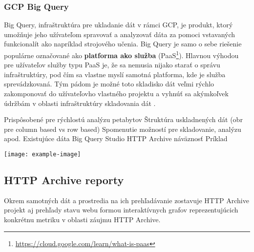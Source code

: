 \subsubsection{GCP Big Query}

Big Query, infraštruktúra pre ukladanie dát v rámci GCP, je produkt, ktorý umožňuje jeho užívateľom spravovať a analyzovať dáta za pomoci vstavaných funkcionalít ako napríklad strojového učenia.
Big Query je samo o sebe riešenie populárne označované ako \textbf{platforma ako služba} (PaaS\footnote{\href{https://cloud.google.com/learn/what-is-paas}{https://cloud.google.com/learn/what-is-paas}}).
Hlavnou výhodou pre užívateľov služby typu PaaS je, že sa nemusia nijako starať o správu infraštruktúry, pod čím sa vlastne myslí samotná platforma, kde je služba sprevádzkovaná.
Tým pádom je možné toto skladisko dát veľmi rýchlo zakomponovať do užívateľovho vlastného projektu a vyhnúť sa akýmkoľvek údržbám v oblasti infraštruktúry skladovania dát \cite{google-bq}.

Prispôsobené pre rýchlostú analýzu petabytov
Štruktúra uskladnených dát (obr pre column based vs row based)
Spomenutie možností pre skladovanie, analýzu apod.
Existujúce dáta
Big Query Studio
HTTP Archive náväznosť
Príklad

\begin{center}
\noindent\texttt{[image: example-image]}    
\end{center}


\subsection{HTTP Archive reporty}

Okrem samotných dát a prostredia na ich prehľadávanie zostavuje HTTP Archive projekt aj prehľady stavu webu formou interaktívnych grafov reprezentujúcich konkrétnu metriku v oblasti záujmu HTTP Archive.

